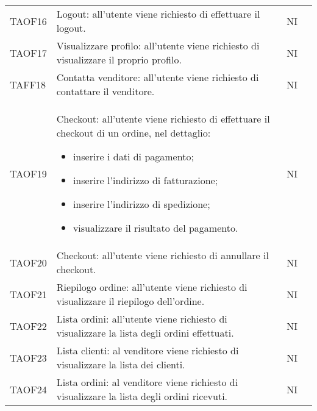 \begin{center}
\begin{longtable}[!h]{p{50px} p{245px} p{75px} p{50px}}
        TAOF16                           & Logout: all'utente viene richiesto di effettuare il logout.                                                                                                         & NI             \\
        TAOF17                           & Visualizzare profilo: all'utente viene richiesto di visualizzare il proprio profilo.                                                                                & NI             \\
        TAFF18                           & Contatta venditore: all'utente viene richiesto di contattare il venditore.                                                                                          & NI             \\
        TAOF19                           & Checkout: all'utente viene richiesto di effettuare il checkout di un ordine, nel dettaglio: \begin{itemize} \item inserire i dati di pagamento; \item inserire l'indirizzo di fatturazione; \item inserire l'indirizzo di spedizione; \item visualizzare il risultato del pagamento. \end{itemize}                                              & NI             \\
        TAOF20                           & Checkout: all'utente viene richiesto di annullare il checkout.                                                                                                      & NI             \\
        TAOF21                           & Riepilogo ordine: all'utente viene richiesto di visualizzare il riepilogo dell'ordine.                                                                              & NI             \\
        TAOF22                           & Lista ordini: all'utente viene richiesto di visualizzare la lista degli ordini effettuati.                                                                          & NI             \\
        TAOF23                           & Lista clienti: al venditore viene richiesto di visualizzare la lista dei clienti.                                                                                   & NI             \\
        TAOF24                           & Lista ordini: al venditore viene richiesto di visualizzare la lista degli ordini ricevuti.                                                                          & NI             \\

\end{longtable}
\end{center}
